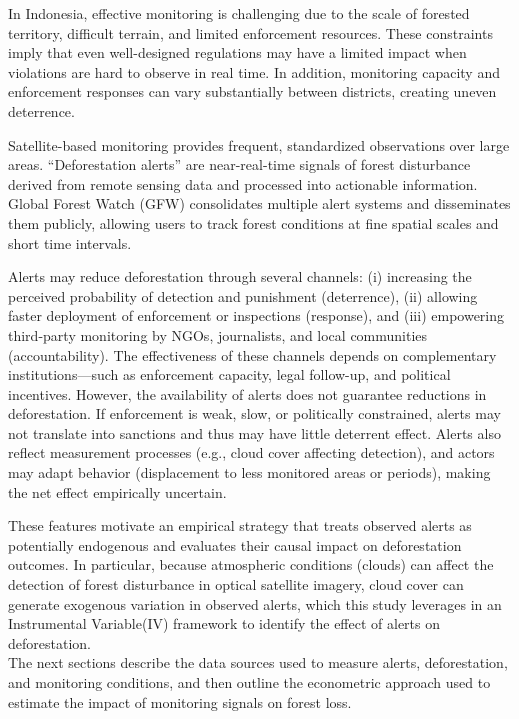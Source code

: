 \documentclass[hidelinks,12pt]{article}
\begin{document}
In Indonesia, effective monitoring is challenging due to the scale of forested territory, difficult terrain, and limited enforcement resources. These constraints imply that even well-designed regulations may have a limited impact when violations are hard to observe in real time. In addition, monitoring capacity and enforcement responses can vary substantially between districts, creating uneven deterrence.

Satellite-based monitoring provides frequent, standardized observations over large areas. “Deforestation alerts” are near-real-time signals of forest disturbance derived from remote sensing data and processed into actionable information. Global Forest Watch (GFW) consolidates multiple alert systems and disseminates them publicly, allowing users to track forest conditions at fine spatial scales and short time intervals.

Alerts may reduce deforestation through several channels: (i) increasing the perceived probability of detection and punishment (deterrence), (ii) allowing faster deployment of enforcement or inspections (response), and (iii) empowering third-party monitoring by NGOs, journalists, and local communities (accountability). The effectiveness of these channels depends on complementary institutions—such as enforcement capacity, legal follow-up, and political incentives.
However, the availability of alerts does not guarantee reductions in deforestation. If enforcement is weak, slow, or politically constrained, alerts may not translate into sanctions and thus may have little deterrent effect. Alerts also reflect measurement processes (e.g., cloud cover affecting detection), and actors may adapt behavior (displacement to less monitored areas or periods), making the net effect empirically uncertain.

These features motivate an empirical strategy that treats observed alerts as potentially endogenous and evaluates their causal impact on deforestation outcomes. In particular, because atmospheric conditions (clouds) can affect the detection of forest disturbance in optical satellite imagery, cloud cover can generate exogenous variation in observed alerts, which this study leverages in an Instrumental Variable(IV) framework to identify the effect of alerts on deforestation.\\
The next sections describe the data sources used to measure alerts, deforestation, and monitoring conditions, and then outline the econometric approach used to estimate the impact of monitoring signals on forest loss.
\end{document}
